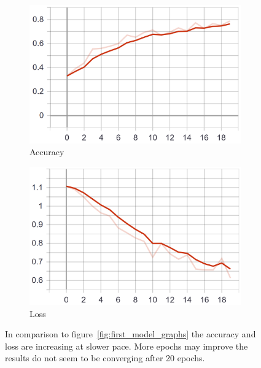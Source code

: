 \begin{figure}
    \centering
    \begin{subfigure}[b]{0.4\textwidth}
        \includegraphics[width=\textwidth]{images/first_model_data_augmentation_acc.png}
        \caption{Accuracy}
        \label{fig:first_model_data_augmentation_acc}
    \end{subfigure}
    \begin{subfigure}[b]{0.4\textwidth}
        \includegraphics[width=\textwidth]{images/first_model_data_augmentation_loss.png}
        \caption{Loss}
        \label{fig:first_model_data_augmentation_loss}
    \end{subfigure}
    \caption{In comparison to figure~\ref{fig:first_model_graphs} the accuracy and loss are increasing at slower pace. More epochs may improve the results do not seem to be converging after 20 epochs.}
    \label{fig:first_model_data_augmentation_graphs}
\end{figure}

